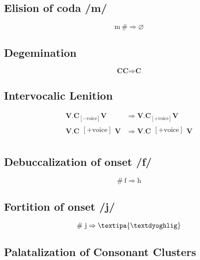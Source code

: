 \documentclass{report}
\begin{document}
\subsection{Elision of coda /m/}

\begin{equation}
  \text{m}\ \# \Rightarrow \varnothing
\end{equation}

\subsection{Degemination}

\begin{equation}
  \textbf{CC} \Rightarrow \textbf{C}
\end{equation}

\subsection{Intervocalic Lenition}

\begin{align}
  \textbf{V.C}_{[-\text{voice}]}\textbf{V} & \Rightarrow \textbf{V.C}_{[+\text{voice}]}\textbf{V} \\
  \textbf{V.C}\substack{[+\text{voice}] \\ [+\text{stop}]}\textbf{V} & \Rightarrow \textbf{V.C}\substack{[+\text{voice}] \\ [+\text{fricative}]}\textbf{V}
\end{align}

\subsection{Debuccalization of onset /f/}

\begin{equation}
  \#\ \text{f} \Rightarrow \text{h}
\end{equation}

\subsection{Fortition of onset /j/}

\begin{equation}
  \#\ \text{j} \Rightarrow \text{\textipa{\textdyoghlig}}
\end{equation}

\subsection{Palatalization of Consonant Clusters}
\end{document}
